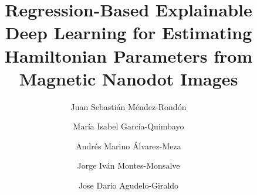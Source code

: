 \documentclass[final,5p,times,twocolumn]{elsarticle}
\begin{document}
\newcommand{\Real}{\mathbb{R}}
\newcommand{\N}{\mathbb{N}}
\newcommand{\Z}{\mathbb{Z}}
\newcommand{\X}{\mathcal{X}}
\newcommand{\Y}{\mathcal{Y}}
\newcommand{\boldV}{\mathbf{V}}
\newcommand{\dataset}{{\cal D}}
\newcommand{\gauss}{\mathcal{N}} 

\providecommand{\ch}[1]{\textcolor{blue}{#1}}

\let\WriteBookmarks\relax
\def\floatpagepagefraction{1}
\def\textpagefraction{.001}


\begin{frontmatter}


\title{Regression-Based Explainable Deep Learning for Estimating Hamiltonian Parameters from Magnetic Nanodot Images}

\author[unal]{Juan Sebasti\'an M\'endez-Rond\'on}

\author[unal]{Mar\'ia Isabel Garc\'ia-Quimbayo}

\author[unal]{Andr\'es Marino \'Alvarez-Meza}

\author[unal1]{Jorge Iv\'an Montes-Monsalve}

\author[uam]{Jose Dar\'io Agudelo-Giraldo}

\address[unal]{AI-Lab, Signal Processing and Recognition Group, Universidad Nacional de Colombia, Sede Manizales, 170003 Manizales, Colombia}

\address[unal1]{Direcci\'on Acad\'emica, Universidad Nacional de Colombia, Sede de La Paz, 202010 La Paz, Colombia}

\address[uam]{Grupo de Investigaci\'on en F\'isica y Matem\'aticas con \'Enfasis en la Formaci\'on de Ingenieros, Departamento de F\'isica y Matem\'aticas, Facultad de Ingenier\'ia, Universidad Aut\'onoma de Manizales, Antigua Estaci\'on del Ferrocarril, 170002  Manizales, Colombia}





\end{frontmatter}
\end{document}
